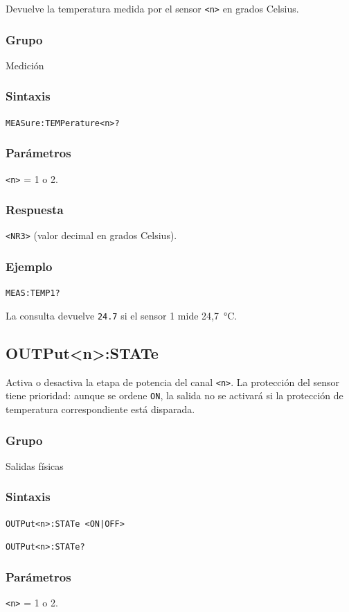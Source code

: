 Devuelve la temperatura medida por el sensor \texttt{<n>} en grados Celsius.

\subsubsection*{Grupo}
Medición

\subsubsection*{Sintaxis}
\texttt{MEASure:TEMPerature<n>?}

\subsubsection*{Parámetros}
\texttt{<n>} = 1 o 2.

\subsubsection*{Respuesta}
\texttt{<NR3>} (valor decimal en grados Celsius).

\subsubsection*{Ejemplo}
\texttt{MEAS:TEMP1?}

La consulta devuelve \texttt{24.7} si el sensor 1 mide 24,7~°C.

\subsection*{OUTPut<n>:STATe}

Activa o desactiva la etapa de potencia del canal \texttt{<n>}. La protección del sensor tiene prioridad: aunque se ordene \texttt{ON}, la salida no se activará si la protección de temperatura correspondiente está
disparada.

\subsubsection*{Grupo}
Salidas físicas

\subsubsection*{Sintaxis}
\texttt{OUTPut<n>:STATe <ON|OFF>}\par
\texttt{OUTPut<n>:STATe?}

\subsubsection*{Parámetros}
\texttt{<n>} = 1 o 2.

